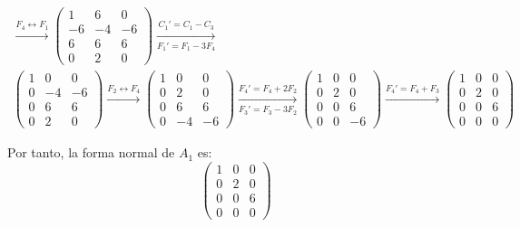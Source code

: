\begin{ejercicio}
\begin{enumerate}
\begin{multline*}
            \xrightarrow{F_4\leftrightarrow F_1}
            \begin{pmatrix}
                1 & 6 & 0\\
                -6 & -4 & -6 \\
                6 & 6 & 6 \\
                0 & 2 & 0 
            \end{pmatrix}
            \xrightarrow[F_1'=F_1-3F_4]{C_1'=C_1-C_3}\\
            \begin{pmatrix}
                1 & 0 & 0\\
                0 & -4 & -6 \\
                0 & 6 & 6 \\
                0 & 2 & 0 
            \end{pmatrix}
            \xrightarrow{F_2\leftrightarrow F_4}
            \begin{pmatrix}
                1 & 0 & 0\\
                0 & 2 & 0\\
                0 & 6 & 6 \\
                0 & -4 & -6 
            \end{pmatrix}
            \xrightarrow[F_3'=F_3-3F_2]{F_4'=F_4+2F_2}
            \begin{pmatrix}
                1 & 0 & 0\\
                0 & 2 & 0\\
                0 & 0 & 6 \\
                0 & 0 & -6
            \end{pmatrix}
            \xrightarrow{F_4'=F_4+F_3}
            \begin{pmatrix}
                1 & 0 & 0\\
                0 & 2 & 0\\
                0 & 0 & 6 \\
                0 & 0 & 0
            \end{pmatrix}
        \end{multline*}

        Por tanto, la forma normal de $A_1$ es:
        \begin{equation*}
            \begin{pmatrix}
                1 & 0 & 0\\
                0 & 2 & 0\\
                0 & 0 & 6 \\
                0 & 0 & 0
            \end{pmatrix}
        \end{equation*}


\end{enumerate}
\end{ejercicio}
